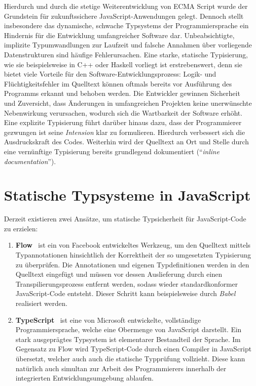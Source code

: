 Hierdurch und durch die stetige Weiterentwicklung von ECMA Script wurde der Grundstein für zukunftssichere JavaScript-Anwendungen gelegt. Dennoch stellt insbesondere das dynamische, schwache Typsystems der Programmiersprache ein Hindernis für die Entwicklung umfangreicher Software dar. Unbeabsichtigte, implizite Typumwandlungen zur Laufzeit und falsche Annahmen über vorliegende Datenstrukturen sind häufige Fehlerursachen. Eine starke, statische Typisierung, wie sie beispielsweise in C++ oder Haskell vorliegt ist erstrebenswert, denn sie bietet viele Vorteile für den Software-Entwicklungsprozess: Logik- und Flüchtigkeitsfehler im Quelltext können oftmals bereits vor Ausführung des Programms erkannt und behoben werden. Die Entwickler gewinnen Sicherheit und Zuversicht, dass Änderungen in umfangreichen Projekten keine unerwünschte Nebenwirkung verursachen, wodurch sich die Wartbarkeit der Software erhöht. Eine explizite Typisierung führt darüber hinaus dazu, dass der Programmierer gezwungen ist seine \emph{Intension} klar zu formulieren. Hierdurch verbessert sich die Ausdruckskraft des Codes. Weiterhin wird der Quelltext an Ort und Stelle durch eine vernünftige Typisierung bereits grundlegend dokumentiert (\enquote{\emph{inline documentation}}).

\section{Statische Typsysteme in JavaScript}

Derzeit existieren zwei Ansätze, um statische Typsicherheit für JavaScript-Code zu erzielen:

\begin{enumerate}
    \item \textbf{Flow}~\autocite{flow} ist ein von Facebook entwickeltes Werkzeug, um den Quelltext mittels Typannotationen hinsichtlich der Korrektheit der so umgesetzten Typisierung zu überprüfen. Die Annotationen und eigenen Typdefinitionen werden in den Quelltext eingefügt und müssen vor dessen Auslieferung durch einen Transpilierungsprozess entfernt werden, sodass wieder standardkonformer JavaScript-Code entsteht. Dieser Schritt kann beispielsweise durch \emph{Babel}~\autocite{babel} realisiert werden.

    \item \textbf{TypeScript}~\autocite{typescript} ist eine von Microsoft entwickelte, vollständige Programmiersprache, welche eine Obermenge von JavaScript darstellt. Ein stark ausgeprägtes Typsystem ist elementarer Bestandteil der Sprache. Im Gegensatz zu Flow wird TypeScript-Code durch einen Compiler in JavaScript übersetzt, welcher auch auch die statische Typprüfung vollzieht. Diese kann natürlich auch simultan zur Arbeit des Programmierers innerhalb der integrierten Entwicklungsumgebung ablaufen.
\end{enumerate}

